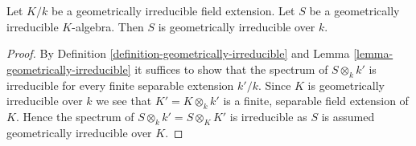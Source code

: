 \begin{lemma}
\label{lemma-geometrically-irreducible-transitive}
Let $K/k$ be a geometrically irreducible field extension.
Let $S$ be a geometrically irreducible $K$-algebra.
Then $S$ is geometrically irreducible over $k$.
\end{lemma}

\begin{proof}
By Definition \ref{definition-geometrically-irreducible}
and Lemma \ref{lemma-geometrically-irreducible} it suffices to show
that the spectrum of $S \otimes_k k'$ is irreducible for every
finite separable extension $k'/k$. Since $K$ is geometrically irreducible
over $k$ we see that $K' = K \otimes_k k'$
is a finite, separable field extension of $K$.
Hence the spectrum of $S \otimes_k k' = S \otimes_K K'$ is
irreducible as $S$ is assumed geometrically irreducible over $K$.
\end{proof}